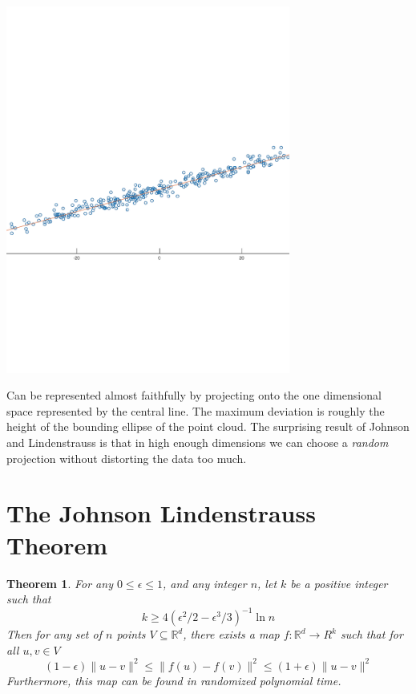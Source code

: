 \documentclass[11pt]{article}
\newcommand{\arr}{\rightarrow}
\newcommand{\R}{\mathbb{R}}
\newtheorem{Thm}{Theorem}
\begin{document}
\begin{center}
    \includegraphics[trim=0 240 0 280, clip,width=0.7\textwidth]{2dprimaryaxis.pdf}
\end{center}

Can be represented almost faithfully by projecting onto the one dimensional
space represented by the central line. The maximum deviation is roughly the
height of the bounding ellipse of the point cloud. The surprising result of
Johnson and Lindenstrauss is that in high enough dimensions we can choose a
\textit{random} projection without distorting the data too much.

\section{The Johnson Lindenstrauss Theorem}

\begin{Thm}

  For any $0 \leq \epsilon \leq 1$, and any integer $n$, let $k$ be a positive
  integer such that
  \[ 
    k \geq 4(\epsilon^2/2 - \epsilon^3/3)^{-1} \ln n 
  \]
  Then for any set of $n$ points $V \subseteq \R^d$, there exists a map
  $f:\R^d \arr R^k$ such that for all $u, v \in V$
  \[
    (1-\epsilon)\|u - v\|^2 \leq \| f(u) - f(v) \|^2 \leq (1+\epsilon) \| u - v \|^2 
  \]
  Furthermore, this map can be found in randomized polynomial time.

\end{Thm}
\end{document}

